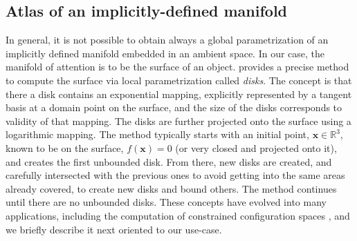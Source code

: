 


\subsection{Atlas of an implicitly-defined manifold}
\label{sec:atlas-rrt}


In general, it is not possible to obtain always a global parametrization of an implicitly defined manifold embedded in an ambient space. In our case, the manifold of attention is to be the surface of an object. \citet{Henderson1993COMPUTING} provides a precise method to compute the surface via local parametrization called \emph{disks}. The concept is that there a disk contains an exponential mapping, explicitly represented by a tangent basis at a domain point on the surface, and the size of the disks corresponds to validity of that mapping. The disks are further projected onto the surface using a logarithmic mapping. The method typically starts with an initial point, $\mathbf{x} \in \mathbb{R}^3$, known to be on the surface, $f(\mathbf{x}) = 0$ (or very closed and projected onto it), and creates the first unbounded disk. From there, new disks are created, and carefully intersected with the previous ones to avoid getting into the same areas already covered, to create new disks and bound others. The method continues until there are no unbounded disks. These concepts have evolved into many applications, including the computation of constrained configuration spaces \citet{Porta2014CuikSuite}, and we briefly describe it next oriented to our use-case.


